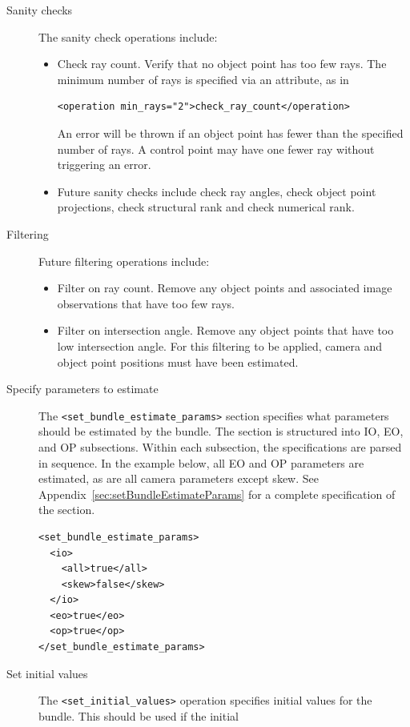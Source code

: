 \documentclass{article}
\begin{document}
\begin{description}
\item[{Sanity checks}] The sanity check operations include:
\begin{itemize}
\item Check ray count. Verify that no object point has too few rays. The
minimum number of rays is specified via an attribute, as in
\begin{verbatim}
<operation min_rays="2">check_ray_count</operation>
\end{verbatim}
An error will be thrown if an object point has fewer than the
specified number of rays. A control point may have one fewer ray
without triggering an error.
\item Future sanity checks include check ray angles, check object point
projections, check structural rank and check numerical rank.
\end{itemize}
\item[{Filtering}] Future filtering operations include:
\begin{itemize}
\item Filter on ray count. Remove any object points
and associated image observations that have too few rays.
\item Filter on intersection angle. Remove any object points that have
too low intersection angle. For this filtering to be applied,
camera and object point positions must have been estimated.
\end{itemize}
\item[{Specify parameters to estimate}] The \texttt{<set\_bundle\_estimate\_params>}
section specifies what parameters should be estimated by the
bundle. The section is structured into IO, EO, and OP
subsections. Within each subsection, the specifications are
parsed in sequence. In the example below, all EO and OP
parameters are estimated, as are all camera parameters except
skew. See Appendix~\ref{sec:setBundleEstimateParams} for a
complete specification of the section.
\begin{verbatim}
<set_bundle_estimate_params>
  <io>
    <all>true</all>
    <skew>false</skew>
  </io>
  <eo>true</eo>
  <op>true</op>
</set_bundle_estimate_params>
\end{verbatim}
\item[{Set initial values}] The \texttt{<set\_initial\_values>} operation specifies
initial values for the bundle. This should be used if the initial

\end{description}
\end{document}

